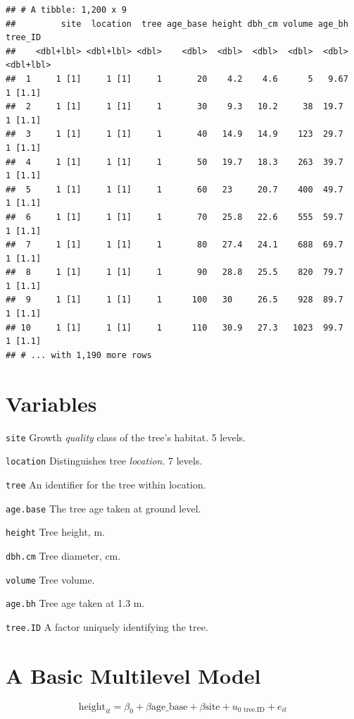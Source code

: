 \documentclass[
]{article}
\begin{document}
\begin{verbatim}
## # A tibble: 1,200 x 9
##         site  location  tree age_base height dbh_cm volume age_bh   tree_ID
##    <dbl+lbl> <dbl+lbl> <dbl>    <dbl>  <dbl>  <dbl>  <dbl>  <dbl> <dbl+lbl>
##  1     1 [1]     1 [1]     1       20    4.2    4.6      5   9.67   1 [1.1]
##  2     1 [1]     1 [1]     1       30    9.3   10.2     38  19.7    1 [1.1]
##  3     1 [1]     1 [1]     1       40   14.9   14.9    123  29.7    1 [1.1]
##  4     1 [1]     1 [1]     1       50   19.7   18.3    263  39.7    1 [1.1]
##  5     1 [1]     1 [1]     1       60   23     20.7    400  49.7    1 [1.1]
##  6     1 [1]     1 [1]     1       70   25.8   22.6    555  59.7    1 [1.1]
##  7     1 [1]     1 [1]     1       80   27.4   24.1    688  69.7    1 [1.1]
##  8     1 [1]     1 [1]     1       90   28.8   25.5    820  79.7    1 [1.1]
##  9     1 [1]     1 [1]     1      100   30     26.5    928  89.7    1 [1.1]
## 10     1 [1]     1 [1]     1      110   30.9   27.3   1023  99.7    1 [1.1]
## # ... with 1,190 more rows
\end{verbatim}

\hypertarget{variables}{%
\section{Variables 🌲}\label{variables}}

\texttt{site} Growth \emph{quality} class of the tree's habitat. 5
levels.

\texttt{location} Distinguishes tree \emph{location}. 7 levels.

\texttt{tree} An identifier for the tree within location.

\texttt{age.base} The tree age taken at ground level.

\texttt{height} Tree height, m.

\texttt{dbh.cm} Tree diameter, cm.

\texttt{volume} Tree volume.

\texttt{age.bh} Tree age taken at 1.3 m.

\texttt{tree.ID} A factor uniquely identifying the tree.

\hypertarget{a-basic-multilevel-model}{%
\section{A Basic Multilevel Model}\label{a-basic-multilevel-model}}

\[\text{height}_{it} = \beta_0 + \beta \text{age_base} + \beta \text{site} + u_{0\text{ tree.ID}} + e_{it}\]
\end{document}
